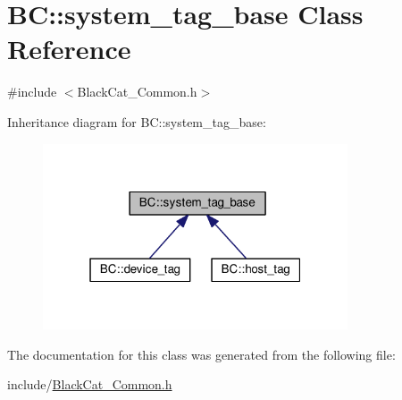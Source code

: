\hypertarget{classBC_1_1system__tag__base}{}\section{BC\+:\+:system\+\_\+tag\+\_\+base Class Reference}
\label{classBC_1_1system__tag__base}


{\ttfamily \#include $<$Black\+Cat\+\_\+\+Common.\+h$>$}



Inheritance diagram for BC\+:\+:system\+\_\+tag\+\_\+base\+:
\nopagebreak
\begin{figure}[H]
\begin{center}
\leavevmode
\includegraphics[width=256pt]{classBC_1_1system__tag__base__inherit__graph}
\end{center}
\end{figure}


The documentation for this class was generated from the following file\+:\begin{DoxyCompactItemize}
\item 
include/\hyperlink{BlackCat__Common_8h}{Black\+Cat\+\_\+\+Common.\+h}\end{DoxyCompactItemize}
